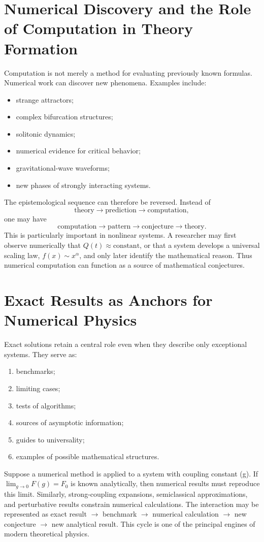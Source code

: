 \section{ Numerical Discovery and the Role of Computation in Theory Formation}
Computation is not merely a method for evaluating previously known formulas.
Numerical work can discover new phenomena.
Examples include:
\begin{itemize}
\item strange attractors;
\item complex bifurcation structures;
\item solitonic dynamics;
\item numerical evidence for critical behavior;
\item gravitational-wave waveforms;
\item new phases of strongly interacting systems.
\end{itemize}
The epistemological sequence can therefore be reversed.
Instead of
\[
\text{theory}
\rightarrow
\text{prediction}
\rightarrow
\text{computation},
\]
one may have
\[
\text{computation}
\rightarrow
\text{pattern}
\rightarrow
\text{conjecture}
\rightarrow
\text{theory}.
\]
This is particularly important in nonlinear systems.
A researcher may first observe numerically that
$Q(t)\approx \text{constant}$,
or that a system develops a universal scaling law,
$f(x)\sim x^\alpha$,
and only later identify the mathematical reason.
Thus numerical computation can function as a source of mathematical conjectures.

\section{ Exact Results as Anchors for Numerical Physics}
Exact solutions retain a central role even when they describe only exceptional systems.
They serve as:
\begin{enumerate}
\item benchmarks;
\item limiting cases;
\item tests of algorithms;
\item sources of asymptotic information;
\item guides to universality;
\item examples of possible mathematical structures.
\end{enumerate}
Suppose a numerical method is applied to a system with coupling constant (g).
If $\lim_{g\rightarrow 0} F(g)=F_0$
is known analytically, then numerical results must reproduce this limit.
Similarly, strong-coupling expansions, semiclassical approximations, and 
perturbative results constrain numerical calculations.
The interaction may be represented as
exact result $\rightarrow$ benchmark $\rightarrow$ numerical calculation 
$\rightarrow$ new conjecture $\rightarrow$ new analytical result.
This cycle is one of the principal engines of modern theoretical physics.

